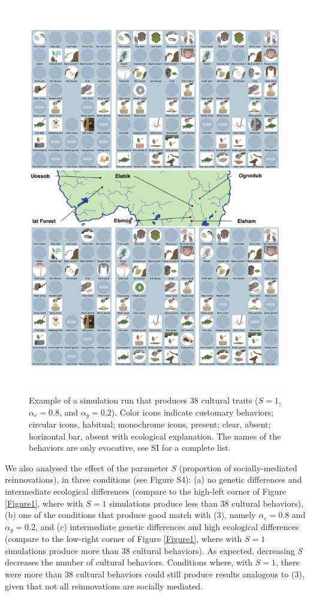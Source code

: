 \documentclass[9pt,twocolumn,twoside,]{pnas-new}
\begin{document}
\begin{figure}[h!]
\begin{center}
\includegraphics[width=11.8cm]{figures/figure_2.pdf}
\caption{Example of a simulation run that produces 38 cultural traits ($S=1$, $\alpha_e=0.8$, and $\alpha_g=0.2$). Color icons indicate customary behaviors; circular icons, habitual; monochrome icons, present; clear, absent;  horizontal bar, absent with ecological explanation. The names of the behaviors are only evocative, see SI for a complete list.}
\label{Figure2}
\end{center}
\end{figure}

We also analysed the effect of the parameter \(S\) (proportion of
socially-mediated reinnovations), in three conditions (see Figure S4):
(a) no genetic differences and intermediate ecological differences
(compare to the high-left corner of Figure \ref{Figure1}, where with
\(S=1\) simulations produce less than 38 cultural behaviors), (b) one of
the conditions that produce good match with (3), namely \(\alpha_e=0.8\)
and \(\alpha_g=0.2\), and (c) intermediate genetic differences and high
ecological differences (compare to the low-right corner of Figure
\ref{Figure1}, where with \(S=1\) simulations produce more than 38
cultural behaviors). As expected, decreasing \emph{S} decreases the
number of cultural behaviors. Conditions where, with \(S=1\), there were
more than 38 cultural behaviors could still produce results analogous to
(3), given that not all reinnovations are socially mediated.
\end{document}
